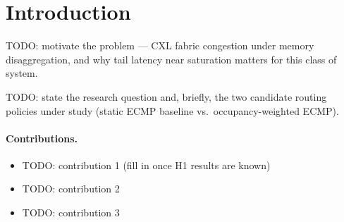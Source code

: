 %

\section{Introduction}
\label{sec:introduction}

TODO: motivate the problem — CXL fabric congestion under memory
disaggregation, and why tail latency near saturation matters for this
class of system.

TODO: state the research question and, briefly, the two candidate
routing policies under study (static ECMP baseline vs.\ occupancy-weighted
ECMP).

\paragraph{Contributions.}
\begin{itemize}
  \item TODO: contribution 1 (fill in once H1 results are known)
  \item TODO: contribution 2
  \item TODO: contribution 3
\end{itemize}

